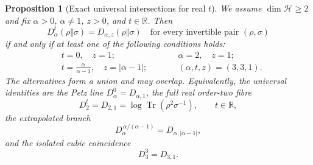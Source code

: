 \documentclass[11pt]{article}
\newtheorem{proposition}[proposition]{Proposition}
\theoremstyle{remark}
\newcommand{\1}{\mathbbm{1}}
\begin{document}
\begin{proposition}[Exact universal intersections for real $t$]
\label{rw:prop:alpha-z-intersections}
We assume $\dim\mathcal H\geq2$ and fix $\alpha>0$, $\alpha\neq1$,
$z>0$, and $t\in\mathbb R$.  Then
\begin{equation}
 D_\alpha^t(\rho\Vert\sigma)
 =D_{\alpha,z}(\rho\Vert\sigma)
 \quad\text{for every invertible pair }(\rho,\sigma)
 \label{rw:eq:alpha-z-universal-equality}
\end{equation}
if and only if at least one of the following conditions holds:
\begin{equation}
 \begin{aligned}
 &t=0,\quad z=1;\qquad
 &&\alpha=2,\quad z=1;\\
 &t=\frac{\alpha}{\alpha-1},\quad
   z=\lvert\alpha-1\rvert;\qquad
 &&(\alpha,t,z)=(3,3,1).
 \end{aligned}
 \label{rw:eq:alpha-z-intersection-locus}
\end{equation}
The alternatives form a union and may overlap.  Equivalently, the
universal identities are the Petz line $D_\alpha^0=D_{\alpha,1}$,
the full real order-two fibre
\begin{equation}
 D_2^t=D_{2,1}
 =\log\operatorname{Tr}(\rho^2\sigma^{-1}),
 \qquad t\in\mathbb R,
 \label{rw:eq:alpha-z-order-two-fibre}
\end{equation}
the extrapolated branch
\begin{equation}
 D_\alpha^{\,\alpha/(\alpha-1)}
 =D_{\alpha,\lvert\alpha-1\rvert},
 \label{rw:eq:alpha-z-extrapolated-intersection}
\end{equation}
and the isolated cubic coincidence
\begin{equation}
 D_3^3=D_{3,1}.
 \label{rw:eq:alpha-z-cubic-intersection}
\end{equation}
\end{proposition}
\end{document}
